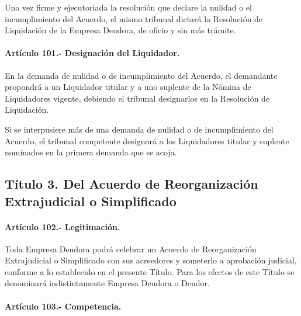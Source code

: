 \documentclass[
]{book}
\begin{document}
Una vez firme y ejecutoriada la resolución que declare la nulidad o el incumplimiento del Acuerdo, el mismo tribunal dictará la Resolución de Liquidación de la Empresa Deudora, de oficio y sin más trámite.

\hypertarget{artuxedculo-101.--designaciuxf3n-del-liquidador.}{%
\paragraph*{Artículo 101.- Designación del Liquidador.}\label{artuxedculo-101.--designaciuxf3n-del-liquidador.}}

En la demanda de nulidad o de incumplimiento del Acuerdo, el demandante propondrá a un Liquidador titular y a uno suplente de la Nómina de Liquidadores vigente, debiendo el tribunal designarlos en la Resolución de Liquidación.

Si se interpusiere más de una demanda de nulidad o de incumplimiento del Acuerdo, el tribunal competente designará a los Liquidadores titular y suplente nominados en la primera demanda que se acoja.

\hypertarget{tuxedtulo-3.-del-acuerdo-de-reorganizaciuxf3n-extrajudicial-o-simplificado}{%
\subsection*{Título 3. Del Acuerdo de Reorganización Extrajudicial o Simplificado}\label{tuxedtulo-3.-del-acuerdo-de-reorganizaciuxf3n-extrajudicial-o-simplificado}}

\hypertarget{artuxedculo-102.--legitimaciuxf3n.}{%
\paragraph*{Artículo 102.- Legitimación.}\label{artuxedculo-102.--legitimaciuxf3n.}}

Toda Empresa Deudora podrá celebrar un Acuerdo de Reorganización Extrajudicial o Simplificado con sus acreedores y someterlo a aprobación judicial, conforme a lo establecido en el presente Título. Para los efectos de este Título se denominará indistintamente Empresa Deudora o Deudor.

\hypertarget{artuxedculo-103.--competencia.}{%
\paragraph*{Artículo 103.- Competencia.}\label{artuxedculo-103.--competencia.}}
\end{document}

